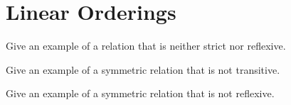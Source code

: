 \chapter{Linear Orderings}

\begin{exercise}
	Give an example of a relation that is neither strict nor reflexive.
\end{exercise}

\begin{exercise}
	Give an example of a symmetric relation that is not transitive.
\end{exercise}

\begin{exercise}
	Give an example of a symmetric relation that is not reflexive.
\end{exercise}
